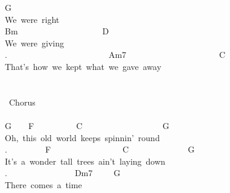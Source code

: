 {G\\
We\ were\ right\\
Bm\ \ \ \ \ \ \ \ \ \ \ \ \ \ \ \ \ \ \ \ D\\
We\ were\ giving\\
.\ \ \ \ \ \ \ \ \ \ \ \ \ \ \ \ \ \ \ \ \ \ \ \ Am7\ \ \ \ \ \ \ \ \ \ \ \ \ \ \ \ \ \ \ \ \ \ C\\
That's\ how\ we\ kept\ what\ we\ gave\ away\\
\\
\\
\lbrack\ Chorus\rbrack\\
\\
G\ \ \ \ F\ \ \ \ \ \ \ \ \ \ C\ \ \ \ \ \ \ \ \ \ \ \ \ \ \ \ \ \ \ G\\
Oh,\ this\ old\ world\ keeps\ spinnin'\ round\ \\
.\ \ \ \ \ \ \ \ \ F\ \ \ \ \ \ \ \ \ \ \ \ \ \ \ \ \ C\ \ \ \ \ \ \ \ \ \ \ \ \ \ G\\
It's\ a\ wonder\ tall\ trees\ ain't\ laying\ down\\
.\ \ \ \ \ \ \ \ \ \ \ \ \ \ \ \ Dm7\ \ \ \ \ G\\
There\ comes\ a\ time}

